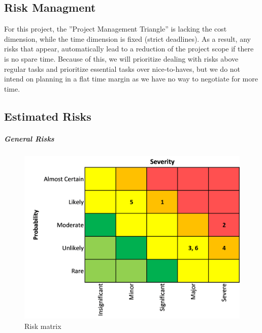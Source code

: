 \subsection{Risk Managment}
For this project, the ”Project Management Triangle” is lacking the cost dimension, while the time dimension is fixed (strict deadlines). As a result, any risks that appear, automatically lead to a reduction of the project scope if there is no spare time. Because of this, we will prioritize dealing with risks above regular tasks and prioritize essential tasks over nice-to-haves, but we do not intend on planning in a flat time margin as we have no way to negotiate for more time.

\subsection{Estimated Risks}

\subparagraph{General Risks}

\begin{figure}[H]
  \includegraphics[width=\linewidth]{resources/risks-matrix.png}
  \caption{Risk matrix}
  \label{risk_matrix}
\end{figure}

